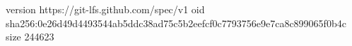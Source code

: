 version https://git-lfs.github.com/spec/v1
oid sha256:0e26d49d4493544ab5ddc38ad75c5b2eefcf0c7793756e9e7ca8c899065f0b4c
size 244623
